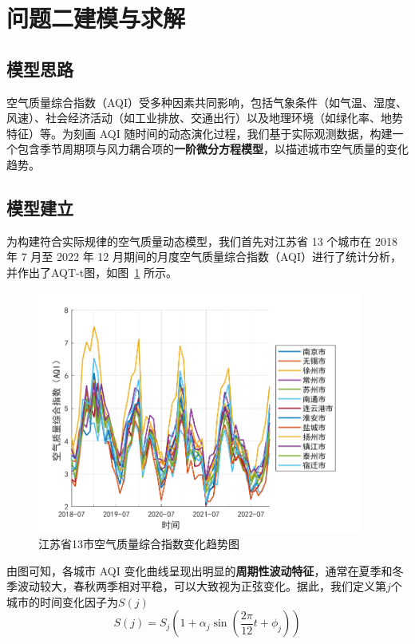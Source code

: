\documentclass[a4paper,12pt]{article}
\begin{document}
	

	\section{问题二建模与求解}
	
	\subsection{模型思路}
	
	空气质量综合指数（AQI）受多种因素共同影响，包括气象条件（如气温、湿度、风速）、社会经济活动（如工业排放、交通出行）以及地理环境（如绿化率、地势特征）等。为刻画 AQI 随时间的动态演化过程，我们基于实际观测数据，构建一个包含季节周期项与风力耦合项的\textbf{一阶微分方程模型}，以描述城市空气质量的变化趋势。
	
	\subsection{模型建立}
	
	为构建符合实际规律的空气质量动态模型，我们首先对江苏省 13 个城市在 2018 年 7 月至 2022 年 12 月期间的月度空气质量综合指数（AQI）进行了统计分析，并作出了AQT-t图，如图~\ref{fig:aqi_trend} 所示。
	\begin{figure}[htbp]
		\centering
		\includegraphics[width=0.95\textwidth]{江苏AQI趋势图.png}
		\caption{江苏省13市空气质量综合指数变化趋势图}
		\label{fig:aqi_trend}
	\end{figure}
	
	由图可知，各城市 AQI 变化曲线呈现出明显的\textbf{周期性波动特征}，通常在夏季和冬季波动较大，春秋两季相对平稳，可以大致视为正弦变化。据此，我们定义第$j$个城市的时间变化因子为$S(j)$
	\begin{equation}
		S(j) = S_j \left(1 + \alpha_j \sin\left(\frac{2\pi}{12}t + \phi_j \right) \right) 
		\label{eq:S0}
	\end{equation}
	
\end{document}
